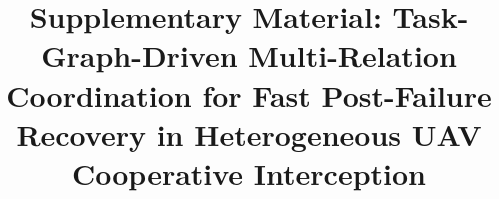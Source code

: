 \documentclass[11pt]{article}
\begin{document}
\title{Supplementary Material: Task-Graph-Driven Multi-Relation Coordination for Fast Post-Failure Recovery in Heterogeneous UAV Cooperative Interception}
\author{}
\maketitle



\end{document}
